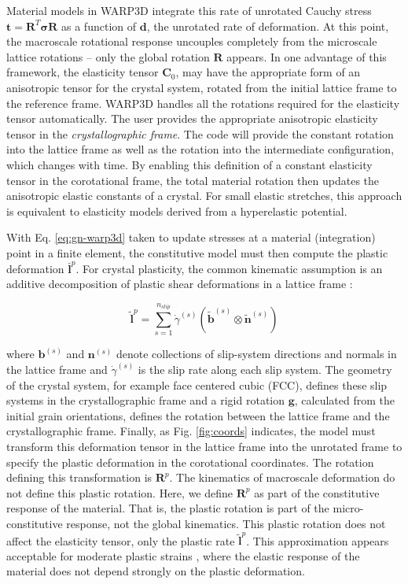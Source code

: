 \documentclass[11pt]{report}
\numberwithin{equation}{section}
\newcommand{\noi}{\noindent}
\begin{document}
Material models in WARP3D integrate this rate of unrotated Cauchy
stress $\mathbf{t}=\mathbf{R}^{T}\bm{\sigma}\mathbf{R}$ as a function
of $\mathbf{d}$, the unrotated rate of deformation.
At this point,
the macroscale rotational response uncouples completely from the microscale
lattice rotations -- only the global rotation $\mathbf{R}$ appears.
 In one advantage of this framework, the elasticity tensor $\mathbf{C}_{0}$, may have the appropriate
form of an anisotropic tensor for the crystal system, rotated from
the initial lattice frame to the reference frame.
WARP3D handles all the rotations required for the elasticity tensor
automatically.
The user provides the appropriate anisotropic elasticity tensor
in the \emph{crystallographic frame}.
The code will provide the constant rotation into the lattice frame as well 
as the rotation into the intermediate configuration, which changes with time.
By enabling this
definition of a constant elasticity tensor in the corotational frame,
the total material rotation then updates the anisotropic elastic constants
of a crystal.
For small elastic stretches, this approach is equivalent
to elasticity models derived from a hyperelastic potential.

With Eq. \ref{eq:gn-warp3d} taken to update stresses at a material (integration)
point in a finite element, the constitutive model must then
compute the plastic deformation $\bar{\mathbf{l}}^{p}$.
For crystal
plasticity, the common kinematic assumption is an additive decomposition
of plastic shear deformations in a lattice frame \cite{A83}:

\begin{equation}
\tilde{\mathbf{l}}^{p}=
\sum_{s=1}^{n_{slip}}\dot{\gamma}^{\left(s\right)}\left(\tilde{\mathbf{b}}^{\left(s\right)}
\otimes\tilde{\mathbf{n}}^{\left(s\right)}\right)\label{eq:flow-rule}
\end{equation}

\noi where $\mathbf{b}^{\left(s\right)}$ and $\mathbf{n}^{\left(s\right)}$
denote collections of slip-system directions and normals in the lattice
frame and $\dot{\gamma}^{\left(s\right)}$ is the slip rate along
each slip system.
The geometry of the crystal system, for example
face centered cubic (FCC), defines these slip systems in the crystallographic
frame and a rigid rotation $\mathbf{g}$, calculated from the initial
grain orientations, defines the rotation between the lattice frame
and the crystallographic frame.
Finally, as Fig. \ref{fig:coords}
indicates, the model must transform this deformation tensor in the
lattice frame into the unrotated frame to specify the plastic deformation
in the corotational coordinates.
The rotation defining this transformation
is $\mathbf{R}^{p}$.
The kinematics of macroscale deformation do
not define this plastic rotation. Here, we define $\mathbf{R}^{p}$
as part of the constitutive response of the
material.
That is, the plastic rotation is part of the micro-constitutive
response, not the global kinematics.
This plastic rotation does not
affect the elasticity tensor, only the plastic rate $\tilde{\mathbf{l}}^{p}$.
This approximation appears acceptable for moderate plastic strains \cite{FS00},
where the elastic response of the material does not depend strongly
on the plastic deformation.
\end{document}
